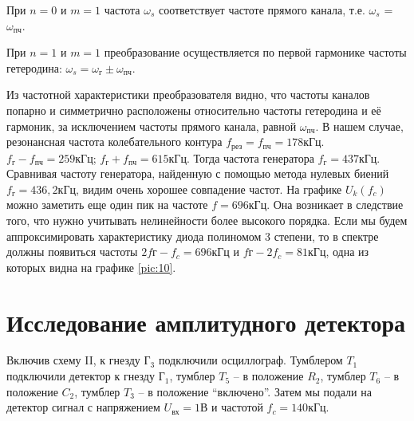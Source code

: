 При $n = 0$ и $m = 1$ частота $\omega_s$ соответствует частоте прямого канала, т.е. $\omega_s$ = $\omega _{\text{пч}}$.

При $n = 1$ и $m = 1$ преобразование осуществляется по первой гармонике частоты гетеродина: $\omega_{s} = \omega_{г} \pm \omega_{\text{пч}}$.

Из частотной характеристики преобразователя видно, что частоты каналов попарно
и симметрично расположены относительно частоты гетеродина и её гармоник, за исключением частоты прямого канала, равной $\omega_{\text{пч}}$. 
В нашем случае, резонансная частота колебательного контура $f_{\text{рез}} = f_{\text{пч}} = 178 \text{кГц}$.
$f_{\text{г}} - f_{\text{пч}} = 259 \text{кГц}$; $f_{\text{г}} + f_{\text{пч}} =615 \text{кГц}$. Тогда частота генератора $f_{\text{г}}= 437 \text{кГц}$. Сравнивая частоту генератора, найденную с помощью метода нулевых биений $f_{\text{г}}=436,2 \text{кГц}$, видим очень хорошее совпадение частот.
На графике $U_k(f_c)$ можно заметить еще один пик на частоте $f=696\text{кГц}$. Она возникает в следствие того, что нужно учитывать нелинейности более высокого порядка. Если мы будем аппроксимировать характеристику диода полиномом 3 степени, то в спектре должны появиться частоты $2f{\text{г}}-f_c=696 \text{кГц}$ и $f{\text{г}}-2f_c=81 \text{кГц}$, одна из которых видна на графике \ref{pic:10}.
\section[Задание 3]{Исследование амплитудного детектора}
Включив схему II, к гнезду $\text{Г}_3$ подключили осциллограф. Тумблером $T_1$ подключили детектор к гнезду $\text{Г}_1$, тумблер $T_5$ -- в положение $R_2$, тумблер $T_6$ -- в положение $C_2$, тумблер $T_3$ -- в положение “включено”. Затем мы подали на детектор сигнал с напряжением $U_{\text{вх}} = 1 \text{В}$ и частотой $f_c = 140 \text{кГц}$.
